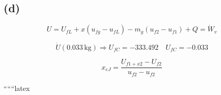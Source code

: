 

\subsection*{(d)}

\[
U = U_{fL} + x \left( u_{fg} - u_{fL} \right) - m_g \left( u_{f2} - u_{f1} \right) + Q = \dot{W}_v
\]

\[
\dot{U} (0.033 \, \text{kg}) \Rightarrow U_{fC} = -333.492 \quad U_{fC} = -0.033
\]

\[
x_{eJ} = \frac{U_{f1+x2} - U_{f2}}{u_{f2} - u_{f2}}
\]

``````latex